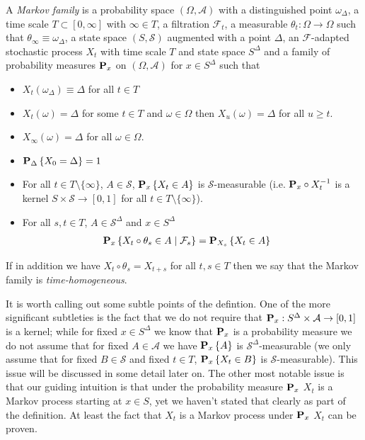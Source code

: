 \begin{defn}\label{HomogeneousMarkovFamilyBlumenthalGetoor}
A \emph{Markov family} is a
probability space $(\Omega, \mathcal{A})$ with a distinguished point $\omega_\Delta$, a time scale $T
\subset [0,\infty]$ with $\infty \in T$, a filtration $\mathcal{F}_t$, a measurable $\theta_t : \Omega \to \Omega$ such that $\theta_\infty \equiv \omega_\Delta$, a state space $(S, \mathcal{S})$ augmented with a point $\Delta$, an $\mathcal{F}$-adapted stochastic process $X_t$ with time scale $T$ and state space $S^\Delta$ and a family of
probability measures $\probabilityop_x$ on $(\Omega, \mathcal{A})$ for $x \in S^\Delta$ such that 
\begin{itemize}
\item[(i)] $X_t(\omega_\Delta) \equiv \Delta$ for all $t \in T$
\item[(ii)] $X_t(\omega) = \Delta$ for some $t \in T$ and $\omega \in \Omega$ then $X_u(\omega) = \Delta$ for all $u \geq t$.
\item[(iii)] $X_\infty(\omega) = \Delta$ for all $\omega \in \Omega$.
\item[(iv)] $\sprobability{X_0 = \Delta}{\Delta} = 1$
\item[(v)] For all $t \in T \setminus \lbrace \infty \rbrace$, $A \in \mathcal{S}$, $\sprobability{X_t \in A}{x}$ is $\mathcal{S}$-measurable (i.e. $\pushforward{X_t}{\probabilityop_x}$ is a kernel $S \times \mathcal{S} \to [0,1]$ for all $t \in T \setminus \lbrace \infty \rbrace$).
\item[(vi)] For all $s,t \in T$, $A \in \mathcal{S}^\Delta$ and $x \in S^\Delta$
\begin{align*}
\csprobability{\mathcal{F}_s}{X_{t} \circ \theta_s \in A}{x}&= \sprobability{X_t \in A}{X_s}
\end{align*}
\end{itemize}
If in addition we have $X_t \circ \theta_s = X_{t+s}$ for all $t,s \in T$ then we say that the Markov family is \emph{time-homogeneous}.
\end{defn}

It is worth calling out some subtle points of the defintion.  One of the more significant subtleties is the fact that we do not require that $\probabilityop_x : S^\Delta \times \mathcal{A} \to [0,1]$ is a kernel; while for fixed $x \in S^\Delta$ we know that $\probabilityop_x$ is a probability measure we do not assume that for fixed $A \in \mathcal{A}$ we have $\sprobability{A}{x}$ is $\mathcal{S}^\Delta$-measurable (we only assume that for fixed $B \in \mathcal{S}$ and fixed $t \in T$, $\sprobability{X_t \in B}{x}$ is $\mathcal{S}$-measurable).  This issue will be discussed in some detail later on.  The other most notable issue is that our guiding intuition is that under the probability measure $\probabilityop_x$ $X_t$ is a Markov process starting at $x \in S$, yet we haven't stated that clearly as part of the definition.  At least the fact that $X_t$ is a Markov process under $\probabilityop_x$ $X_t$ can be proven.

